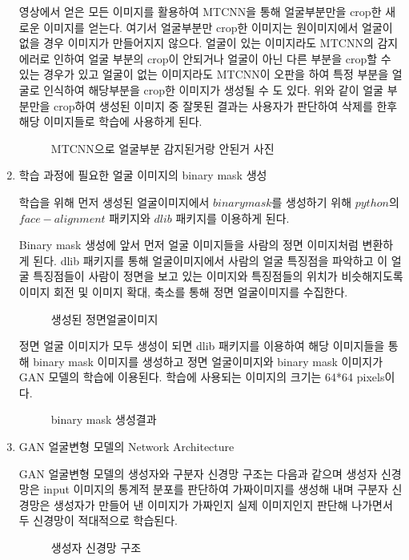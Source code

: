 \documentclass{oblivoir}
\begin{document}
\begin{enumerate}
    영상에서 얻은 모든 이미지를 활용하여 MTCNN을 통해 얼굴부분만을 crop한 새로운 이미지를 얻는다. 여기서 얼굴부분만 crop한 이미지는 원이미지에서 얼굴이 없을 경우 이미지가 만들어지지 않으다. 얼굴이 있는 이미지라도 MTCNN의 감지 에러로 인하여 얼굴 부분의 crop이 안되거나 얼굴이 아닌 다른 부분을 crop할 수 있는 경우가 있고 얼굴이 없는 이미지라도 MTCNN이 오판을 하여 특정 부분을 얼굴로 인식하여 해당부분을 crop한 이미지가 생성될 수 도 있다. 위와 같이 얼굴 부분만을 crop하여 생성된 이미지 중 잘못된 결과는 사용자가 판단하여 삭제를 한후 해당 이미지들로 학습에 사용하게 된다.

    \begin{figure}[h!]%
    \centering
    \caption{MTCNN으로 얼굴부분 감지된거랑 안된거 사진}
    \end{figure}


    \item 학습 과정에 필요한 얼굴 이미지의 binary mask 생성

    학습을 위해 먼저 생성된 얼굴이미지에서 $binary mask$를 생성하기 위해 $python$의 $face-alignment$ 패키지와 $dlib$ 패키지를 이용하게 된다.

    Binary mask 생성에 앞서 먼저 얼굴 이미지들을 사람의 정면 이미지처럼 변환하게 된다. dlib 패키지를 통해 얼굴이미지에서 사람의 얼굴 특징점을 파악하고 이 얼굴 특징점들이 사람이 정면을 보고 있는 이미지와 특징점들의 위치가 비슷해지도록 이미지 회전 및 이미지 확대, 축소를 통해 정면 얼굴이미지를 수집한다.
    \begin{figure}[h!] %
    \centering
    \caption{생성된 정면얼굴이미지}
    \end{figure}



    정면 얼굴 이미지가 모두 생성이 되면 dlib 패키지를 이용하여 해당 이미지들을 통해 binary mask 이미지를 생성하고 정면 얼굴이미지와 binary mask 이미지가 GAN 모델의 학습에 이용된다. 학습에 사용되는 이미지의 크기는 64*64 pixels이다. 
    \begin{figure}[h!]%
    \centering
    \caption{binary mask 생성결과}
    \end{figure}


    \item GAN 얼굴변형 모델의 Network Architecture

    GAN 얼굴변형 모델의 생성자와 구분자 신경망 구조는 다음과 같으며 생성자 신경망은 input 이미지의 통계적 분포를 판단하여 가짜이미지를 생성해 내며 구분자 신경망은 생성자가 만들어 낸 이미지가 가짜인지 실제 이미지인지 판단해 나가면서 두 신경망이 적대적으로 학습된다.
    \begin{figure}[h!]
    \centering
    \caption{생성자 신경망 구조 \cite{reference11}}
    \end{figure}


\end{enumerate}
\end{document}
